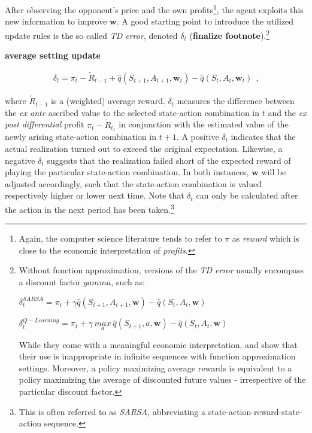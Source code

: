 After observing the opponent's price and the own profits\footnote{Again, the computer science literature tends to refer to $\pi$ as \emph{reward} which is close to the economic interpretation of \emph{profits}.}, the agent exploits this new information to improve $\boldsymbol{w}$. A good starting point to introduce the utilized update rules is the so called \emph{TD error}, denoted $\delta_t$ (\textbf{finalize footnote}).\footnote{Without function approximation, versions of the \emph{TD error} usually encompass a discount factor $gamma$, such as:
	\begin{center}
		$\delta_t^{SARSA} = \pi_t + \gamma \hat{q}(S_{t+1}, A_{t+1}, \boldsymbol{w}) - \hat{q}(S_t, A_t, \boldsymbol{w})$
		
		$\delta_t^{Q-Learning} = \pi_t + \gamma ~ \underset{a}{max} ~ \hat{q}(S_{t+1}, a, \boldsymbol{w}) - \hat{q}(S_t, A_t, \boldsymbol{w})$
\end{center}
While they come with a meaningful economic interpretation, \textcite{sutton_reinforcement_2018} and \textcite{naik_discounted_2019} show that their use is inappropriate in infinite sequences with function approximation settings. Moreover, a policy maximizing average rewards is equivalent to a policy maximizing the average of discounted future values - irrespective of the particular discount factor.}

\textbf{average setting update}

\begin{gather}
	\delta_t = \pi_t -\widetilde{R}_{t-1} + \hat{q}(S_{t+1}, A_{t+1}, \boldsymbol{w}_t) - \hat{q}(S_t, A_t, \boldsymbol{w}_t) ~~   \text{,}
\end{gather}

where $\widetilde{R}_{t-1}$ is a (weighted) average reward. $\delta_t$ measures the difference between the \emph{ex ante} ascribed value to the selected state-action combination in $t$ and the \emph{ex post} \emph{differential} profit $\pi_t - \widetilde{R}_{t_1}$ in conjunction with the estimated value of the newly arising state-action combination in $t+1$. A positive $\delta_t$ indicates that the actual realization turned out to exceed the original expectation. Likewise, a negative $\delta_t$ suggests that the realization failed short of the expected reward of playing the particular state-action combination. In both instances, $\boldsymbol{w}$ will be adjusted accordingly, such that the state-action combination is valued respectively higher or lower next time. Note that $\delta_t$ can only be calculated after the action in the next period has been taken.\footnote{This is often referred to as \emph{SARSA}, abbreviating a state-action-reward-state-action sequence.}


